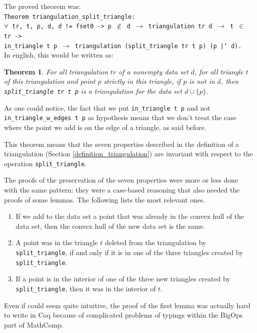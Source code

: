 \documentclass[a4paper,10pt]{article}
\newtheorem{theorem}{Theorem}
\begin{document}
 The proved theorem was:\\
{\tt Theorem triangulation\_split\_triangle:\\
  $\forall$ tr, t, p, d, d != fset0 -> p $\notin$ d $\rightarrow$
                        triangulation tr d $\rightarrow$ t $\in$ tr ->\\
                        in\_triangle t p $\rightarrow$
                        triangulation (split\_triangle tr t p) (p |` d).\\
                       }
In english, this would be written as:
\begin{theorem}
  For all triangulation $tr$ of a nonempty data set $d$,
  for all triangle $t$ of this triangulation and point $p$ strictly in this triangle,
  if $p$ is not in $d$, then
  {\tt split\_triangle tr t p} is a triangulation for the data set $d \cup \{p\}$.
\end{theorem}

As one could notice, the fact that we put {\tt in\_triangle t p} and not {\tt in\_triangle\_w\_edges t p} as hypothesis means that we don't treat the case where the point we add is on the edge of a triangle, as said before. 

This theorem means that the seven properties described in the definition of a triangulation (Section \ref{definition_triangulation}) are invariant with respect to the operation {\tt split\_triangle}.

The proofs of the preservation of the seven properties were more or less done with the same pattern: they were a case-based reasoning that also needed the proofs of some lemmas. The following lists the most relevant ones.
\begin{enumerate}
\item If we add to the data set a point that was already in the convex hull of the data set, then the convex hull of the new data set is the same.
\item A point was in the triangle $t$ deleted from the triangulation by {\tt split\_triangle}, if and only if it is in one of the three triangles created by {\tt split\_triangle}.
\item If a point is in the interior of one of the three new triangles created by {\tt split\_triangle}, then it was in the interior of $t$.
\end{enumerate}

Even if could seem quite intuitive, the proof of the first lemma was actually hard to write in {\sc Coq} because of complicated problems of typings within the BigOps part of {\sc MathComp}.
\end{document}
